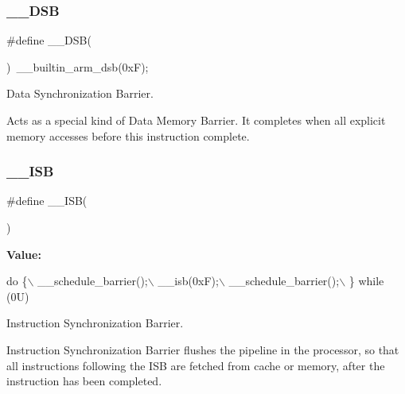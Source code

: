 \subsubsection{\texorpdfstring{\+\_\+\+\_\+\+D\+SB}{\_\_DSB}\hspace{0.1cm}{\footnotesize\ttfamily [2/2]}}
{\footnotesize\ttfamily \#define \+\_\+\+\_\+\+D\+SB(\begin{DoxyParamCaption}{ }\end{DoxyParamCaption})~\+\_\+\+\_\+builtin\+\_\+arm\+\_\+dsb(0x\+F);}



Data Synchronization Barrier. 

Acts as a special kind of Data Memory Barrier. It completes when all explicit memory accesses before this instruction complete. \mbox{\label{group___c_m_s_i_s___core___instruction_interface_gaad233022e850a009fc6f7602be1182f6}} 
\subsubsection{\texorpdfstring{\+\_\+\+\_\+\+I\+SB}{\_\_ISB}\hspace{0.1cm}{\footnotesize\ttfamily [1/2]}}
{\footnotesize\ttfamily \#define \+\_\+\+\_\+\+I\+SB(\begin{DoxyParamCaption}{ }\end{DoxyParamCaption})}

{\bfseries Value\+:}
\begin{DoxyCode}
\textcolor{keywordflow}{do} \{\(\backslash\)
                   \_\_schedule\_barrier();\(\backslash\)
                   \_\_isb(0xF);\(\backslash\)
                   \_\_schedule\_barrier();\(\backslash\)
                \} \textcolor{keywordflow}{while} (0U)
\end{DoxyCode}


Instruction Synchronization Barrier. 

Instruction Synchronization Barrier flushes the pipeline in the processor, so that all instructions following the I\+SB are fetched from cache or memory, after the instruction has been completed. \mbox{\label{group___c_m_s_i_s___core___instruction_interface_gaad233022e850a009fc6f7602be1182f6}} 
